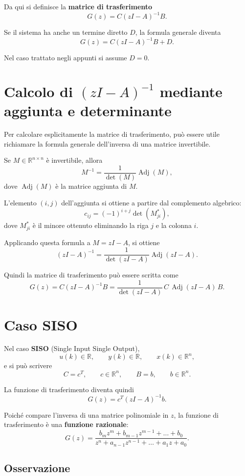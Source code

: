 Da qui si definisce la \textbf{matrice di trasferimento}
\[
G(z)=C(zI-A)^{-1}B.
\]

Se il sistema ha anche un termine diretto \(D\), la formula generale diventa
\[
G(z)=C(zI-A)^{-1}B+D.
\]

Nel caso trattato negli appunti si assume \(D=0\).

\section{Calcolo di \((zI-A)^{-1}\) mediante aggiunta e determinante}

Per calcolare esplicitamente la matrice di trasferimento, pu\`o essere utile richiamare
la formula generale dell'inversa di una matrice invertibile.

Se \(M\in\mathbb{R}^{n\times n}\) \`e invertibile, allora
\[
M^{-1}=\frac{1}{\det(M)}\operatorname{Adj}(M),
\]
dove \(\operatorname{Adj}(M)\) \`e la matrice aggiunta di \(M\).

L'elemento \((i,j)\) dell'aggiunta si ottiene a partire dal complemento algebrico:
\[
c_{ij}=(-1)^{i+j}\det(M^{\ast}_{ji}),
\]
dove \(M^{\ast}_{ji}\) \`e il minore ottenuto eliminando la riga \(j\) e la colonna \(i\).

Applicando questa formula a \(M=zI-A\), si ottiene
\[
(zI-A)^{-1}
=
\frac{1}{\det(zI-A)}\operatorname{Adj}(zI-A).
\]

Quindi la matrice di trasferimento pu\`o essere scritta come
\[
G(z)=C(zI-A)^{-1}B
=
\frac{1}{\det(zI-A)}\,C\,\operatorname{Adj}(zI-A)\,B.
\]

\section{Caso SISO}

Nel caso \textbf{SISO} (Single Input Single Output),
\[
u(k)\in\mathbb{R},\qquad y(k)\in\mathbb{R},\qquad x(k)\in\mathbb{R}^n,
\]
e si pu\`o scrivere
\[
C=c^T,\qquad c\in\mathbb{R}^n,
\qquad
B=b,\qquad b\in\mathbb{R}^n.
\]

La funzione di trasferimento diventa quindi
\[
G(z)=c^T(zI-A)^{-1}b.
\]

Poich\'e compare l'inversa di una matrice polinomiale in \(z\),
la funzione di trasferimento \`e una \textbf{funzione razionale}:
\[
G(z)=
\frac{b_m z^m+b_{m-1}z^{m-1}+\dots+b_0}
{z^n+a_{n-1}z^{n-1}+\dots+a_1 z+a_0}.
\]

\subsection*{Osservazione}

